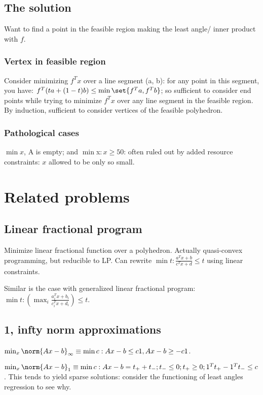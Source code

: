 \documentclass[oneside, article]{memoir}
\begin{document}
\section{The solution}
Want to find a point in the feasible region making the least angle/ inner product with $f$.

\subsection{Vertex in feasible region}
Consider minimizing $f^{T}x$ over a line segment (a, b): for any point in this segment, you have: $f^{T}(ta + (1-t)b) \leq \min \set{f^{T}a, f^{T}b}$; so sufficient to consider end points while trying to minimize $f^{T}x$ over any line segment in the feasible region. By induction, sufficient to consider vertices of the feasible polyhedron.


\subsection{Pathological cases}
$\min x$, A is empty; and $\min $x$: x\geq 50$: often ruled out by added resource constraints: $x$ allowed to be only so small.

\chapter{Related problems}
\section{Linear fractional program}
Minimize linear fractional function over a polyhedron. Actually quasi-convex programming, but reducible to LP. Can rewrite $\min t: \frac{a^{T}x + b}{c^{T}x + d} \leq t$ using linear constraints.

Similar is the case with generalized linear fractional program:\\ $\min t: (\max_i \frac{a_i^{T}x + b_i}{c_i^{T}x + d_i}) \leq t$.

\section{1, infty norm approximations}
$\min_x \norm{Ax - b}_\infty \equiv \min c: Ax - b \leq c1, Ax - b \geq -c1$.

$\min_x \norm{Ax - b}_1 \equiv \min c : Ax - b = t_+ + t_-; t_- \leq 0; t_+ \geq 0; 1^{T} t_+ - 1^{T}t_- \leq c$. This tends to yield sparse solutions: consider the functioning of least angles regression to see why.
\end{document}
